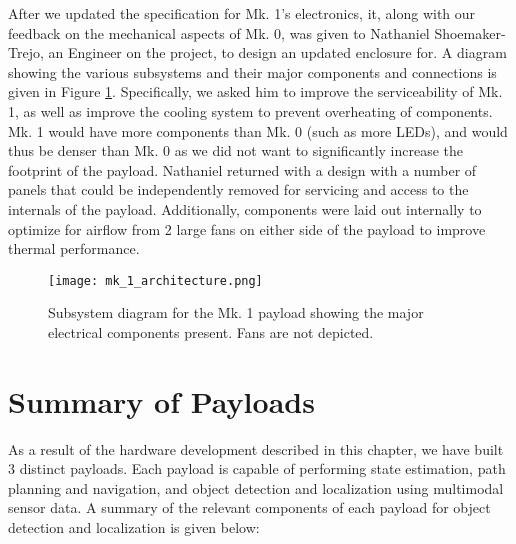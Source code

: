 After we updated the specification for Mk. 1's electronics, it, along with our feedback on the mechanical aspects of Mk. 0, was given to Nathaniel Shoemaker-Trejo, an Engineer on the project, to design an updated enclosure for. A diagram showing the various subsystems and their major components and connections is given in Figure \ref{mk_1_architecture}. Specifically, we asked him to improve the serviceability of Mk. 1, as well as improve the cooling system to prevent overheating of components. Mk. 1 would have more components than Mk. 0 (such as more LEDs), and would thus be denser than Mk. 0 as we did not want to significantly increase the footprint of the payload. Nathaniel returned with a design with a number of panels that could be independently removed for servicing and access to the internals of the payload. Additionally, components were laid out internally to optimize for airflow from 2 large fans on either side of the payload to improve thermal performance.

\begin{figure}
	\centering
	\texttt{[image: mk\_1\_architecture.png]}
	\caption[Subsystem diagram for Mk. 1 payload]{Subsystem diagram for the Mk. 1 payload showing the major electrical components present. Fans are not depicted.}
	\label{mk_1_architecture}
\end{figure}

\section{Summary of Payloads}

As a result of the hardware development described in this chapter, we have built 3 distinct payloads. Each payload is capable of performing state estimation, path planning and navigation, and object detection and localization using multimodal sensor data. A summary of the relevant components of each payload for object detection and localization is given below:

